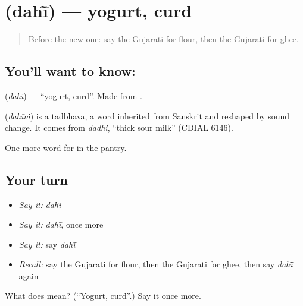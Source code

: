 \section[\texorpdfstring{\gu{દહીં} (dahī̃)}{દહીં (dahī̃)}]{ (dahī̃) — yogurt, curd}

\label{lesson:GU-C58-yogurt}



\begin{quote}
Before the new one: say the Gujarati for flour, then the Gujarati for ghee.
\end{quote}

\subsection*{You'll want to know: }
\textbf{} (\emph{dahī̃}) — \textquotedblleft{}yogurt, curd\textquotedblright{}. Made from \textbf{}.

\begin{cousinweb}
\textbf{} (\emph{dahīṁ}) is a tadbhava, a word inherited from Sanskrit and reshaped by sound change. It comes from \emph{dadhi}, \textquotedblleft{}thick sour milk\textquotedblright{} (CDIAL 6146).
\end{cousinweb}

\begin{grammarlens}[title={What you've built}]
One more word for in the pantry.
\end{grammarlens}

\subsection*{Your turn}
\begin{itemize}
\raggedright
  \item \emph{Say it:} \emph{dahī̃}
  \item \emph{Say it:} \emph{dahī̃}, once more
  \item \emph{Say it:} say \emph{dahī̃}
  \item \emph{Recall:} say the Gujarati for flour, then the Gujarati for ghee, then say \emph{dahī̃} again
\end{itemize}

\begin{tcolorbox}[breakable,colback=teal!4,colframe=teal!35!black,title={Before you move on}]
What does  mean? (\textquotedblleft{}Yogurt, curd\textquotedblright{}.) Say it once more.
\end{tcolorbox}
